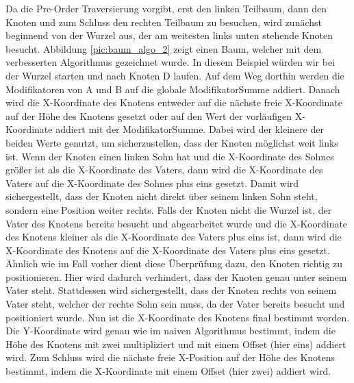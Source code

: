 Da die Pre-Order Traversierung vorgibt, erst den linken Teilbaum, dann den Knoten und zum Schluss den rechten Teilbaum zu besuchen,
wird zunächst beginnend von der Wurzel aus, der am weitesten links unten stehende Knoten besucht. Abbildung \ref{pic:baum_algo_2}
zeigt einen Baum, welcher mit dem verbesserten Algorithmus gezeichnet wurde. In diesem Beispiel würden wir bei der Wurzel starten 
und nach Knoten D laufen. Auf dem Weg dorthin werden die Modifikatoren von A und B auf die globale ModifikatorSumme addiert.
Danach wird die X-Koordinate des Knotens entweder auf die nächste freie X-Koordinate auf der Höhe des Knotens gesetzt oder auf den
Wert der vorläufigen X-Koordinate addiert mit der ModifikatorSumme. Dabei wird der kleinere der beiden Werte genutzt, um sicherzustellen,
dass der Knoten möglichst weit links ist. Wenn der Knoten einen linken Sohn hat und die X-Koordinate des Sohnes größer ist als
die X-Koordinate des Vaters, dann wird die X-Koordinate des Vaters auf die X-Koordinate des Sohnes plus eins gesetzt. 
Damit wird sichergestellt, dass der Knoten nicht direkt über seinem linken Sohn steht, sondern eine Position weiter rechts.
Falls der Knoten nicht die Wurzel ist, der Vater des Knotens bereits besucht und abgearbeitet wurde und die X-Koordinate des Knotens
kleiner als die X-Koordinate des Vaters plus eins ist, dann wird die X-Koordinate des Knotens auf die X-Koordinate des Vaters plus eins gesetzt.
Ähnlich wie im Fall vorher dient diese Überprüfung dazu, den Knoten richtig zu positionieren. Hier wird dadurch verhindert,
dass der Knoten genau unter seinem Vater steht. Stattdessen wird sichergestellt, dass der Knoten rechts von seinem Vater steht,
welcher der rechte Sohn sein muss, da der Vater bereits besucht und positioniert wurde. Nun ist die X-Koordinate des Knotens final
bestimmt worden. Die Y-Koordinate wird genau wie im naiven Algorithmus bestimmt, indem die Höhe des Knotens mit zwei multipliziert
und mit einem Offset (hier eins) addiert wird. Zum Schluss wird die nächste freie X-Position auf der Höhe des Knotens bestimmt,
indem die X-Koordinate mit einem Offset (hier zwei) addiert wird. 


